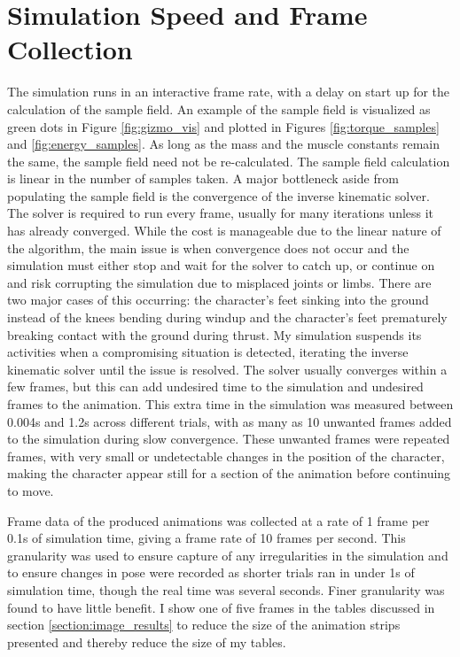 \section{Simulation Speed and Frame Collection}
\label{section:speed_frame_results}
The simulation runs in an interactive frame rate, with a delay on start up for the calculation of the sample field.  An example of the sample field is visualized as green dots in Figure \ref{fig:gizmo_vis} and plotted in Figures \ref{fig:torque_samples} and \ref{fig:energy_samples}.  As long as the mass and the muscle constants remain the same, the sample field need not be re-calculated.  The sample field calculation is linear in the number of samples taken.  A major bottleneck aside from populating the sample field is the convergence of the inverse kinematic solver.  The solver is required to run every frame, usually for many iterations unless it has already converged.  While the cost is manageable due to the linear nature of the algorithm, the main issue is when convergence does not occur and the simulation must either stop and wait for the solver to catch up, or continue on and risk corrupting the simulation due to misplaced joints or limbs.  There are two major cases of this occurring: the character's feet sinking into the ground instead of the knees bending during windup and the character's feet prematurely breaking contact with the ground during thrust.  My simulation suspends its activities when a compromising situation is detected, iterating the inverse kinematic solver until the issue is resolved.  The solver usually converges within a few frames, but this can add undesired time to the simulation and undesired frames to the animation.  This extra time in the simulation was measured between 0.004s and 1.2s across different trials, with as many as 10 unwanted frames added to the simulation during slow convergence.  These unwanted frames were repeated frames, with very small or undetectable changes in the position of the character, making the character appear still for a section of the animation before continuing to move.

Frame data of the produced animations was collected at a rate of 1 frame per 0.1s of simulation time, giving a frame rate of 10 frames per second.  This granularity was used to ensure capture of any irregularities in the simulation and to ensure changes in pose were recorded as shorter trials ran in under 1s of simulation time, though the real time was several seconds.  Finer granularity was found to have little benefit.  I show one of five frames in the tables discussed in section \ref{section:image_results} to reduce the size of the animation strips presented and thereby reduce the size of my tables.

